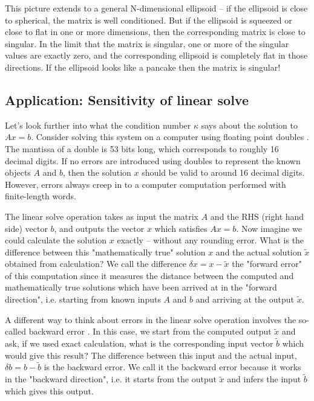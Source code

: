 \documentclass[onefignum,onetabnum]{siamart190516}
\begin{document}
This picture extends to a general N-dimensional
ellipsoid -- if the ellipsoid is close to spherical, the matrix is
well conditioned.  But if the ellipsoid is squeezed or close to flat in one or more
dimensions, then the corresponding matrix is close to singular.
In the limit that the matrix is singular, one or more of the singular 
values are exactly zero, and the corresponding ellipsoid is completely flat in
those directions.  If the ellipsoid looks like a pancake then the matrix
is singular!


\subsection{Application: Sensitivity of linear solve}
Let's look further into what the condition number $\kappa$ says about
the solution to $A x = b$.
Consider solving this system on a computer
using floating point doubles \cite{Moler2014_FloatingPoint}.  The mantissa of a double is 53 bits
long, which corresponds to roughly 16 decimal digits.
If no errors are introduced using doubles to
represent the known objects $A$ and $b$, then the solution $x$ should be
valid to around 16 decimal digits.  However, errors always creep in to a computer
computation performed with finite-length words.

The linear solve operation takes as input the matrix $A$ and the RHS (right
hand side) vector
$b$, and outputs the vector $x$ which satisfies $A x = b$.  Now imagine 
we could calculate the solution $x$ exactly -- without any rounding error.
What is the difference between this "mathematically true" solution $x$ and the 
actual solution $\tilde{x}$ obtained from calculation?  We call the difference
$\delta x = x - \tilde{x}$ the "forward error" of this computation since it
measures the distance between the computed and mathematically true solutions
which have been arrived at in the "forward direction", i.e. starting from known
inputs $A$ and $b$ and arriving at the output $\tilde{x}$.

A different way to think about errors in the linear solve operation involves the
so-called backward error  \cite{Higham2020_BkwdErr}.  In this case, we start from the computed output
$\tilde{x}$ and ask, if we used exact calculation, what is the corresponding
input vector $\tilde{b}$ which would give this result?  The difference between this
input and the actual input, $\delta b = b - \tilde{b}$ is the backward error.  We call
it the backward error because it works in the "backward direction",
i.e. it starts from the output $\tilde{x}$ and infers the 
input $\tilde{b}$ which gives this output.
\end{document}
